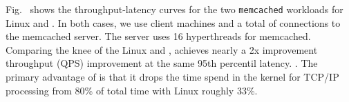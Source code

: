 
 Fig.~\cite{fig:mutilate} shows the
throughput-latency curves for the two \texttt{memcached} workloads for
Linux and \ix. In both cases, we use  client machines and
a total of  connections to the memcached server. The
server uses 16 hyperthreads for memcached. Comparing the knee of the
Linux and \ix, \ix achieves nearly a 2x improvement throughput (QPS)
improvement at the same 95th percentil latency. . The primary
advantage of \ix is that it drops the time spend in the kernel for
TCP/IP processing from 80\% of total time with Linux roughly
 33\%. 


%
